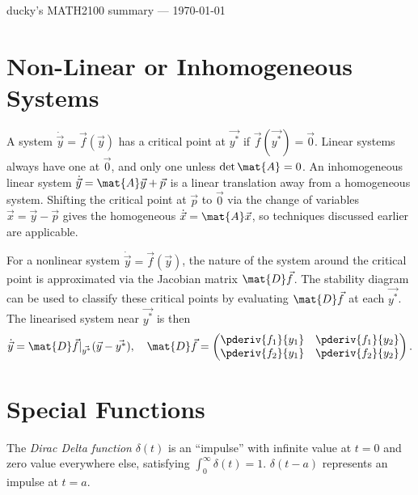 \documentclass[10pt, a4paper]{article}
\begin{document}
\begin{landscape}
\begin{multicols}{2}
    \begin{tcolorbox}[colframe=red!75!black, arc=0pt, outer arc=0pt, center, hbox]
        ducky's MATH2100 summary --- \today
    \end{tcolorbox}

\end{multicols}

\pagebreak

\begin{multicols}{2}
    \section{Non-Linear or Inhomogeneous Systems}

    A system \(\dot{\vec{y}} = \vec{f}(\vec{y})\) has a critical point at \(\vec{y^*}\) if
    \(\vec{f}(\vec{y^*}) = \vec{0}\). Linear systems always have one at \(\vec{0}\), and only one
    unless \(\det \mat{A} = 0\).
    An inhomogeneous linear system \(\dot{\vec{y}} = \mat{A}\vec{y} + \vec{p}\) is a linear
    translation away from a homogeneous system. Shifting the critical point at \(\vec{p}\) to
    \(\vec{0}\) via the change of variables \(\vec{x} = \vec{y} - \vec{p}\) gives the homogeneous
    \(\dot{\vec{x}} = \mat{A} \vec{x}\), so techniques discussed earlier are applicable.
    
    For a nonlinear system \(\dot{\vec{y}} = \vec{f}(\vec{y})\), the nature of the system around the
    critical point is approximated via the Jacobian matrix \(\mat{D}\vec{f}\). 
    The stability diagram can be used to classify these critical points by evaluating \(\mat{D}\vec{f}\)
    at each \(\vec{y^*}\). The linearised system near \(\vec{y^*}\) is then
    \[
        \dot{\vec{y}} = \mat{D}\vec{f} |_{\vec{y^{*}}} (\vec{y} - \vec{y^*}),
        \quad
        \mat{D}\vec{f} = \begin{pmatrix}
            \pderiv{f_1}{y_1} & \pderiv{f_1}{y_2} \\
            \pderiv{f_2}{y_1} & \pderiv{f_2}{y_2}
        \end{pmatrix}.
    \]
    \section{Special Functions}

    The \emph{Dirac Delta function} \(\delta(t)\) is an ``impulse'' with infinite value at \(t = 0\) and
    zero value everywhere else, satisfying \(\int_0^{\infty} \delta(t) = 1\). \(\delta(t - a)\)
    represents an impulse at \(t = a\).


\end{multicols}
\end{landscape}
\end{document}
